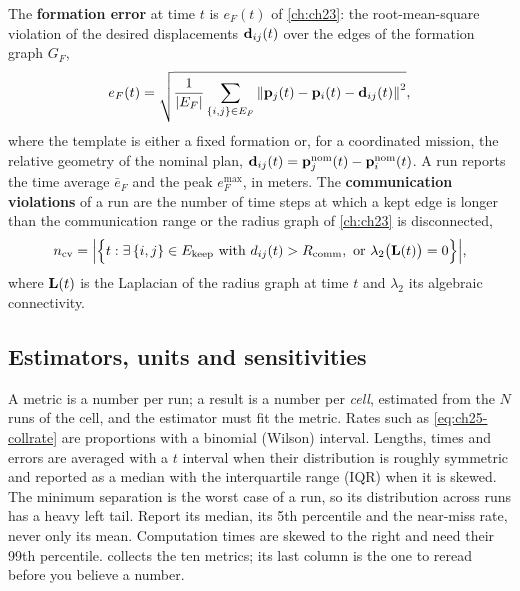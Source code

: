 \begin{definition}
\label{def:ch25-constraints}
The \textbf{formation error} at time $t$
is $e_F(t)$ of \cref{ch:ch23}: the root-mean-square violation of the desired
displacements $\mathbf{d}_{ij}(t)$ over the edges of the formation graph $G_F$,
\begin{equation}
  e_F(t) = \sqrt{\frac{1}{\left\lvert E_F \right\rvert}\sum_{\left\{ i,j \right\} \in E_F}
    \left\lVert \mathbf{p}_j(t) - \mathbf{p}_i(t) - \mathbf{d}_{ij}(t) \right\rVert^2},
  \label{eq:ch25-ef}
\end{equation}
where the template is either a fixed formation or, for a coordinated
mission, the relative geometry of the nominal plan, $\mathbf{d}_{ij}(t) =
\mathbf{p}_j^{\mathrm{nom}}(t) - \mathbf{p}_i^{\mathrm{nom}}(t)$. A run reports the
time average $\bar e_F$ and the peak $e_F^{\max}$, in meters. The
\textbf{communication violations}
of a run are the number of time steps at which a kept edge is longer than
the communication range or the radius graph of \cref{ch:ch23} is
disconnected,
\begin{equation}
  n_{\mathrm{cv}} = \Bigl|\Bigl\{ t : \exists \left\{ i,j \right\} \in E_{\mathrm{keep}}
  \text{ with } d_{ij}(t) > R_{\mathrm{comm}}, \text{ or }
  \lambda_2\bigl(\mathbf{L}(t)\bigr) = 0 \Bigr\}\Bigr|,
  \label{eq:ch25-commviol}
\end{equation}
where $\mathbf{L}(t)$ is the Laplacian of the radius graph at time $t$ and
$\lambda_2$ its algebraic connectivity.
\end{definition}

\subsection{Estimators, units and sensitivities}

A metric is a number per run; a result is a number per \emph{cell},
estimated from the $N$ runs of the cell, and the estimator must fit the
metric. Rates such as \cref{eq:ch25-collrate} are proportions with a
binomial (Wilson) interval. Lengths, times and errors are averaged with a
$t$ interval when their distribution is roughly symmetric and reported as a
median with the interquartile range (IQR) when it is skewed. The minimum
separation is the worst case of a run, so its distribution across runs has a
heavy left tail. Report its median, its 5th percentile and the near-miss
rate, never only its mean. Computation times are skewed to the right and need
their 99th percentile.  collects the ten metrics; its
last column is the one to reread before you believe a number.


